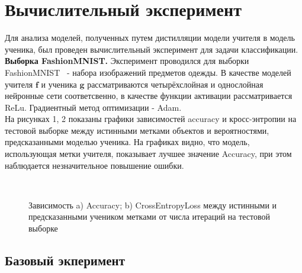 \newpage

\section{Вычислительный эксперимент}

Для анализа моделей, полученных путем дистилляции модели учителя в модель ученика, был проведен вычислительный эксперимент для задачи классификации.\\
\textbf{Выборка FashionMNIST.} Эксперимент проводился для выборки FashionMNIST~\cite{FMNIST} - набора изображений предметов одежды. В качестве моделей учителя $\textbf{f}$ и ученика $\textbf{g}$ рассматриваются четырёхслойная и однослойная нейронные сети соответсвенно, в качестве функции активации рассматривается ReLu. Градиентный метод оптимизации - Adam.\\
На рисунках 1, 2 показаны графики зависимостей accuracy и кросс-энтропии на тестовой выборке между истинными метками объектов и вероятностями, предсказанными моделью ученика. На графиках видно, что модель, использующая метки учителя, показывает лучшее значение Accuracy, при этом наблюдается незначительное повышение ошибки.

\begin{figure}[h!t]\center
{}
\\
\caption{Зависимость a) Accuracy; b) CrossEntropyLoss между истинными и предсказанными учеником метками от числа итераций на тестовой выборке}
\end{figure}


\newpage
\subsection{Базовый экперимент}
